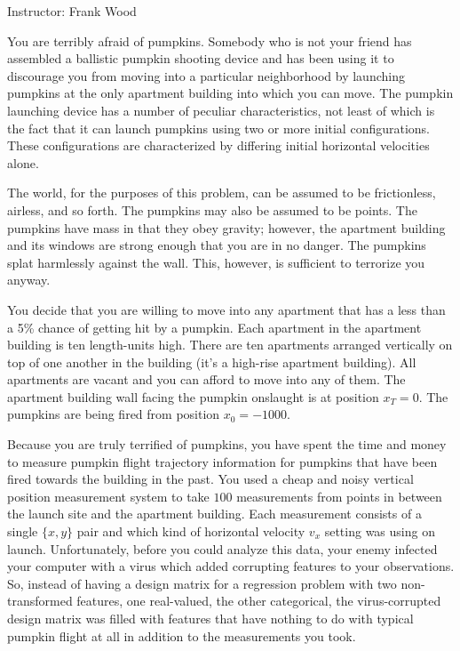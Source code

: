 \documentclass[12pt]{article}
\begin{document}

 \begin{center}
  Instructor: Frank Wood
 \end{center}
\studentinfo
\instructions{

}


You are terribly afraid of pumpkins.  Somebody who is not your friend has assembled a ballistic pumpkin shooting device and has been using it to discourage you from moving into a particular neighborhood by launching pumpkins at the only apartment building into which you can move.  The pumpkin launching device has a number of peculiar characteristics, not least of which is the fact that it can launch pumpkins using two or more initial configurations.  These configurations are characterized by differing initial horizontal velocities alone.  \newline

The world, for the purposes of this problem, can be assumed to be frictionless, airless, and so forth.  The pumpkins may also be assumed to be points.  The pumpkins have mass in that they obey gravity; however, the apartment building and its windows are strong enough that you are in no danger.  The pumpkins splat harmlessly against the wall.  This, however, is sufficient to terrorize you anyway. \newline

You decide that you are willing to move into any apartment that has a less than a 5\% chance of getting hit by a pumpkin.  Each apartment in the apartment building is ten length-units high.  There are ten apartments arranged vertically on top of one another in the building (it's a high-rise apartment building).  All apartments are vacant and you can afford to move into any of them. The apartment building wall facing the pumpkin onslaught is at position $x_T=0$.  The pumpkins are being fired from position $x_0=-1000$.\newline

Because you are truly terrified of pumpkins, you have spent the time and money to measure pumpkin flight trajectory information for pumpkins that have been fired towards the building in the past.  You used a cheap and noisy vertical position measurement system to take  $100$ measurements from points in between the launch site and the apartment building.  Each measurement consists of a single $\{x,y\}$ pair and which kind of horizontal velocity $v_x$ setting was using on launch.   Unfortunately, before you could analyze this data, your enemy infected your computer with a virus which added corrupting features to your observations.  So, instead of having a design matrix for a regression problem with two non-transformed features, one real-valued, the other categorical, the virus-corrupted design matrix was filled with features that have nothing to do with typical pumpkin flight at all in addition to the measurements you took.  \newline
\end{document}
